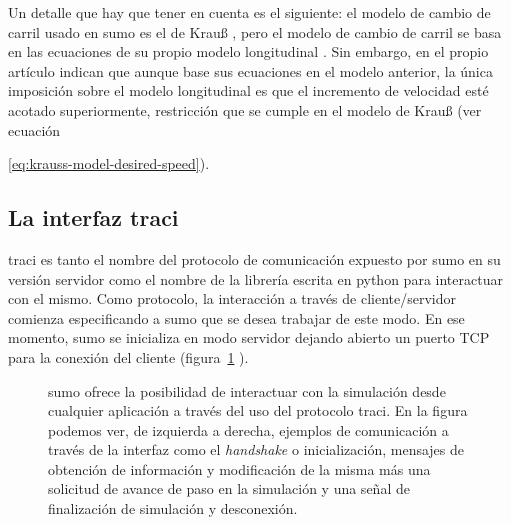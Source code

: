 Un detalle que hay que tener en cuenta es el siguiente: el modelo de cambio de carril usado en \gls{sumo} es el de Krauß \cite{krauss1998microscopic}, pero el modelo de cambio de carril se basa en las ecuaciones de su propio modelo longitudinal \cite{Gipps1981}. Sin embargo, en el propio artículo indican que aunque base sus ecuaciones en el modelo anterior, la única imposición sobre el modelo longitudinal es que el incremento de velocidad esté acotado superiormente, restricción que se cumple en el modelo de Krauß (ver ecuación{\ref{eq:krauss-model-desired-speed}).

\subsection{La interfaz \gls{traci}}

\gls{traci} \cite{Wegener2008} es tanto el nombre del protocolo de comunicación expuesto por \gls{sumo} en su versión servidor como el nombre de la librería escrita en \gls{python} para interactuar con el mismo. Como protocolo, la interacción a través de cliente/servidor comienza especificando a \gls{sumo} que se desea trabajar de este modo. En ese momento, \gls{sumo} se inicializa en modo servidor dejando abierto un puerto TCP para la conexión del cliente (figura~\ref{fig:traci-messages} ).

\begin{figure}
	\centering
	\caption[Ejemplo de forma de envío de mensajes a través de TraCI]{\gls{sumo} ofrece la posibilidad de interactuar con la simulación desde cualquier aplicación a través del uso del protocolo \gls{traci}. En la figura podemos ver, de izquierda a derecha, ejemplos de comunicación a través de la interfaz como el \textit{handshake} o inicialización, mensajes de obtención de información y modificación de la misma más una solicitud de avance de paso en la simulación y una señal de finalización de simulación y desconexión.}
	\label{fig:traci-messages}
\end{figure}

}
